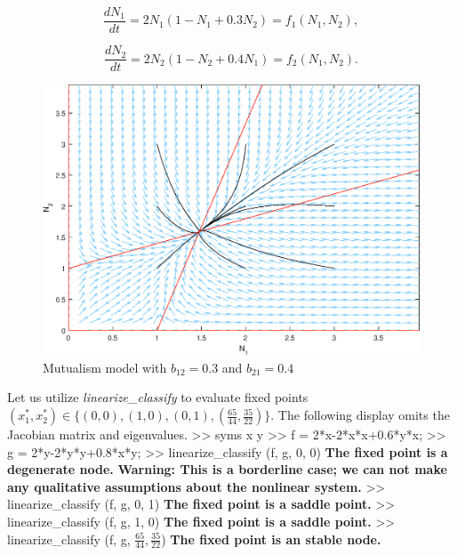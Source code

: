 \documentclass[11pt,a4paper]{scrartcl}
\theoremstyle{definition}
\begin{document}
\begin{equation} \label{eq22}
	\frac{dN_1}{dt}=2N_1(1-N_1+0.3N_2)=f_1(N_1, N_2),
\end{equation}

\begin{equation} \label{eq23}
	\frac{dN_2}{dt}=2N_2(1-N_2+0.4N_1)=f_2(N_1, N_2).
\end{equation}

\begin{figure}[!ht]
\centering
\includegraphics[scale=.72]{fig1.eps}
\centering
\caption{Mutualism model with  $b_{12} = 0.3$ and $b_{21} = 0.4$}
\label{figM1}
\end{figure}

 Let us utilize \textit{linearize\_classify} to evaluate fixed points $(x_1^{*}, x_2^{*}) \in \Big\{(0,0), (1,0), (0,1), (\frac{65}{44}, \frac{35}{22}) \Big\}$. The following display omits the Jacobian matrix and eigenvalues.
\newline
>> syms x y\newline
>> f = 2*x-2*x*x+0.6*y*x;\newline
>> g = 2*y-2*y*y+0.8*x*y;\newline
>> linearize\_classify (f, g, 0, 0)\newline
\textbf{The fixed point is a degenerate node.}\newline
\textbf{Warning: This is a borderline case; we can not make any qualitative assumptions about the nonlinear system.}\newline
>> linearize\_classify (f, g, 0, 1)\newline
\textbf{The fixed point is a saddle point.}\newline
>> linearize\_classify (f, g, 1, 0)\newline
\textbf{The fixed point is a saddle point.}\newline
>> linearize\_classify (f, g, $\frac{65}{44}, \frac{35}{22}$)\newline
\textbf{The fixed point is an stable node.}\newline
\end{document}
